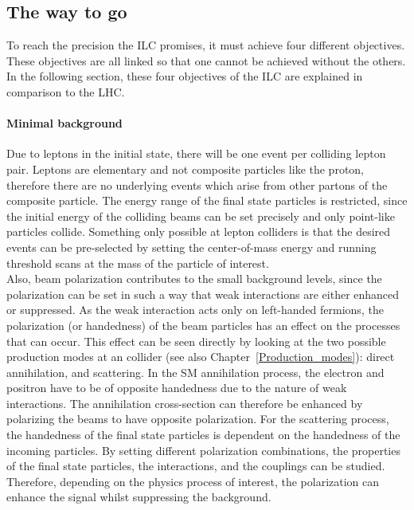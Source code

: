 \subsection{The way to go}
To reach the precision the ILC promises, it must achieve four different objectives.
These objectives are all linked so that one cannot be achieved without the others.
In the following section, these four objectives of the ILC are explained in comparison to the LHC.

\paragraph{Minimal background}
Due to leptons in the initial state, there will be one event per colliding lepton pair.
Leptons are elementary and not composite particles like the proton, therefore there are no underlying events which arise from other partons of the composite particle.
The energy range of the final state particles is restricted, since the initial energy of the colliding beams can be set precisely and only point-like particles collide.
Something only possible at lepton colliders is that the desired events can be pre-selected by setting the center-of-mass energy and running threshold scans at the mass of the particle of interest.\\
Also, beam polarization contributes to the small background levels, since the polarization can be set in such a way that weak interactions are either enhanced or suppressed.
As the weak interaction acts only on left-handed fermions, the polarization (or handedness) of the beam particles has an effect on the processes that can occur.
This effect can be seen directly by looking at the two possible production modes at an \positron\electron collider (see also Chapter~\ref{Production_modes}):
direct \positron\electron annihilation, and \positron\electron scattering.
In the SM annihilation process, the electron and positron have to be of opposite handedness due to the nature of weak interactions.
The annihilation cross-section can therefore be enhanced by polarizing the beams to have opposite polarization.
For the \positron\electron scattering process, the handedness of the final state particles is dependent on the handedness of the incoming particles.
By setting different polarization combinations, the properties of the final state particles, the interactions, and the couplings can be studied. %
Therefore, depending on the physics process of interest, the polarization can enhance the signal whilst suppressing the background. 
